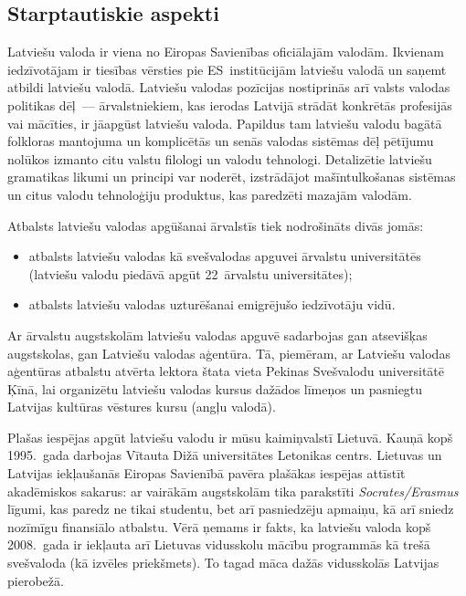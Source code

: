 \begin{multicols}{2}
\subsection{Starptautiskie aspekti}

Latviešu valoda ir viena no Eiropas Savienības oficiālajām valodām.  Ikvienam iedzīvotājam ir tiesības vērsties pie ES~institūcijām latviešu valodā un saņemt atbildi latviešu valodā.  Latviešu valodas pozīcijas nostiprinās arī valsts valodas politikas dēļ~--- ārvalstniekiem, kas ierodas Latvijā strādāt konkrētās profesijās vai mācīties, ir jāapgūst latviešu valoda.  Papildus tam latviešu valodu bagātā folkloras mantojuma un komplicētās un senās valodas sistēmas dēļ pētījumu nolūkos izmanto citu valstu filologi un valodu tehnologi.  Detalizētie latviešu gramatikas likumi un principi var noderēt, izstrādājot mašīntulkošanas sistēmas un citus valodu tehnoloģiju produktus, kas paredzēti mazajām valodām.

Atbalsts latviešu valodas apgūšanai ārvalstīs tiek nodrošināts divās jomās:

\begin{itemize}
\item  atbalsts latviešu valodas kā svešvalodas apguvei ārvalstu universitātēs (latviešu valodu piedāvā apgūt 22~ārvalstu universitātes);
\item  atbalsts latviešu valodas uzturēšanai emigrējušo iedzīvotāju vidū.
\end{itemize}

Ar ārvalstu augstskolām latviešu valodas apguvē sadarbojas gan atsevišķas augstskolas, gan Latviešu valodas aģentūra.  Tā, piemēram, ar Latviešu valodas aģentūras atbalstu atvērta lektora štata vieta Pekinas Svešvalodu universitātē Ķīnā, lai organizētu latviešu valodas kursus dažādos līmeņos un pasniegtu Latvijas kultūras vēstures kursu (angļu valodā).

Plašas iespējas apgūt latviešu valodu ir mūsu kaimiņvalstī Lietuvā.  Kauņā kopš 1995.~gada darbojas Vītauta Dižā universitātes Letonikas centrs.  Lietuvas un Latvijas iekļaušanās Eiropas Savienībā pavēra plašākas iespējas attīstīt akadēmiskos sakarus: ar vairākām augstskolām tika parakstīti \textit{Socrates/Erasmus} līgumi, kas paredz ne tikai studentu, bet arī pasniedzēju apmaiņu, kā arī sniedz nozīmīgu finansiālo atbalstu.  Vērā ņemams ir fakts, ka latviešu valoda kopš 2008.~gada ir iekļauta arī Lietuvas vidusskolu mācību programmās kā trešā svešvaloda (kā izvēles priekšmets).  To tagad māca dažās vidusskolās Latvijas pierobežā.


\end{multicols}
